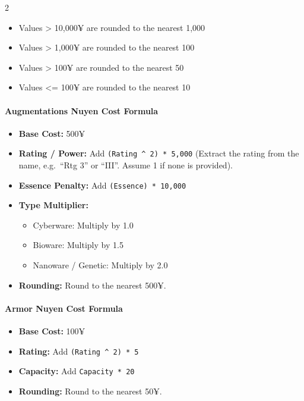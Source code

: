 \documentclass[
  oneside]{article}
\providecommand{\tightlist}{%
  \setlength{\itemsep}{0pt}\setlength{\parskip}{0pt}}
\begin{document}
\begin{multicols}{2}
\begin{itemize}
  \begin{itemize}
  \tightlist
  \item
    Values \textgreater{} 10,000¥ are rounded to
    the nearest 1,000
  \item
    Values \textgreater{} 1,000¥ are rounded to
    the nearest 100
  \item
    Values \textgreater{} 100¥ are rounded to the
    nearest 50
  \item
    Values \textless= 100¥ are rounded to the
    nearest 10
  \end{itemize}
\end{itemize}

\hypertarget{augmentations-nuyen-cost-formula}{%
\paragraph{Augmentations Nuyen Cost
Formula}\label{augmentations-nuyen-cost-formula}}

\begin{itemize}
\tightlist
\item
  \textbf{Base Cost:} 500¥
\item
  \textbf{Rating / Power:} Add
  \texttt{(Rating\ \^{}\ 2)\ *\ 5,000} (Extract
  the rating from the name, e.g.~``Rtg 3'' or
  ``III''. Assume 1 if none is provided).
\item
  \textbf{Essence Penalty:} Add
  \texttt{(Essence)\ *\ 10,000}
\item
  \textbf{Type Multiplier:}

  \begin{itemize}
  \tightlist
  \item
    Cyberware: Multiply by 1.0
  \item
    Bioware: Multiply by 1.5
  \item
    Nanoware / Genetic: Multiply by 2.0
  \end{itemize}
\item
  \textbf{Rounding:} Round to the nearest 500¥.
\end{itemize}

\hypertarget{armor-nuyen-cost-formula}{%
\paragraph{Armor Nuyen Cost
Formula}\label{armor-nuyen-cost-formula}}

\begin{itemize}
\tightlist
\item
  \textbf{Base Cost:} 100¥
\item
  \textbf{Rating:} Add
  \texttt{(Rating\ \^{}\ 2)\ *\ 5}
\item
  \textbf{Capacity:} Add \texttt{Capacity\ *\ 20}
\item
  \textbf{Rounding:} Round to the nearest 50¥.
\end{itemize}


\end{multicols}
\end{document}
